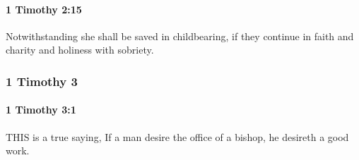 		\paragraph{1 Timothy 2:15} %
			\label{1TIMOTHY-2-15}

			Notwithstanding she shall be saved in childbearing, if they continue in faith and charity and holiness with sobriety.

			\begin{framed}
			\scriptsize
				\begin{compactdesc}
					\item[SBLG] 
				\end{compactdesc}
			\end{framed}

	\subsubsection{1 Timothy 3} %
		\label{1TIMOTHY-3}
		
		\paragraph{1 Timothy 3:1} %
			\label{1TIMOTHY-3-1}

			THIS is a true saying, If a man desire the office of a bishop, he desireth a good work.

